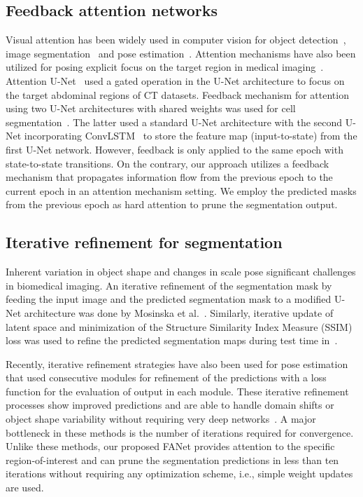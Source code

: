 \documentclass[journal]{IEEEtran}
\begin{document}
\subsection{Feedback attention networks}
Visual attention has been widely used in computer vision for object detection~\cite{chen2017sca-cnn}, image segmentation~\cite{CY2016Attention,ye2019cross} and pose estimation~\cite{Chu2017MulticontextAF}. Attention mechanisms have also been utilized for posing explicit focus on the target region in medical imaging~\cite{SCHLEMPER2019197,LUNDERVOLD2019102}. Attention U-Net~\cite{oktay2018attention} used a gated operation in the U-Net architecture to focus on the target abdominal regions of CT datasets. Feedback mechanism for attention using two U-Net architectures with shared weights was used for cell segmentation~\cite{tsuda2020feedback,shibuya2020feedback}. The latter used a standard U-Net architecture with the second U-Net incorporating ConvLSTM~\cite{NIPS2015_07563a3f} to store the feature map (input-to-state) from the first U-Net network. However, feedback is only applied to the same epoch with state-to-state transitions. On the contrary, our approach utilizes a feedback mechanism that propagates information flow from the previous epoch to the current epoch in an attention mechanism setting. We employ the predicted masks from the previous epoch as hard attention to prune the segmentation output.
\subsection{Iterative refinement for segmentation}
Inherent variation in object shape and changes in scale pose significant challenges in biomedical imaging. An iterative refinement of the segmentation mask by feeding the input image and the predicted segmentation mask to a modified U-Net architecture was done by Mosinska et al.~\cite{mosinska2018beyond}. Similarly, iterative update of latent space and minimization of the Structure Similarity Index Measure (SSIM) loss was used to refine the predicted segmentation maps during test time in~\cite{Prashant:ECCV20}.

Recently, iterative refinement strategies have also been used for pose estimation~\cite{newell2016stacked,ramakrishna2014pose,wei2016convolutional} that used consecutive modules for refinement of the predictions with a loss function for the evaluation of output in each module. These iterative refinement processes show improved predictions and are able to handle domain shifts or object shape variability without requiring very deep networks~\cite{Prashant:ECCV20}. A major bottleneck in these methods is the number of iterations required for convergence. Unlike these methods, our proposed FANet provides attention to the specific region-of-interest and can prune the segmentation predictions in less than ten iterations without requiring any optimization scheme, i.e., simple weight updates are used. 
\end{document}
